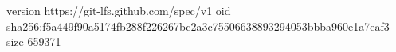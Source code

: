 version https://git-lfs.github.com/spec/v1
oid sha256:f5a449f90a5174fb288f226267bc2a3c75506638893294053bbba960e1a7eaf3
size 659371
